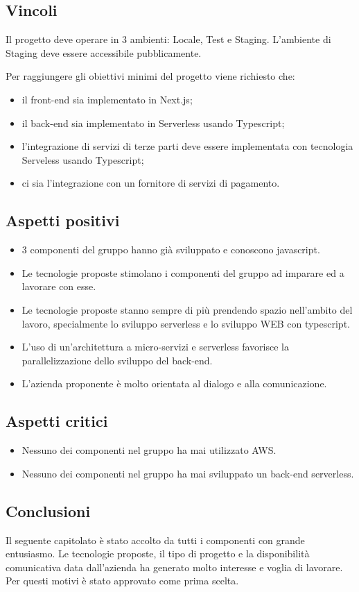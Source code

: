 \subsection{Vincoli}
Il progetto deve operare in 3 ambienti: Locale, Test e Staging.
L'ambiente di Staging deve essere accessibile pubblicamente.

Per raggiungere gli obiettivi minimi del progetto viene richiesto che:
\begin{itemize}
	\item il front-end sia implementato in Next.js;
	\item il back-end sia implementato in Serverless usando Typescript;
	\item l'integrazione di servizi di terze parti deve essere implementata con tecnologia Serveless usando Typescript;
	\item ci sia l'integrazione con un fornitore di servizi di pagamento.
\end{itemize}

\subsection{Aspetti positivi}
\begin{itemize}
	\item 3 componenti del gruppo hanno già sviluppato e conoscono javascript.
	\item Le tecnologie proposte stimolano i componenti del gruppo ad imparare ed a lavorare con esse.
	\item Le tecnologie proposte stanno sempre di più prendendo spazio nell'ambito del lavoro, specialmente lo sviluppo serverless e lo sviluppo WEB con typescript.
	\item L'uso di un'architettura a micro-servizi e serverless favorisce la parallelizzazione dello sviluppo del back-end.
	\item L'azienda proponente è molto orientata al dialogo e alla comunicazione.
\end{itemize}

\subsection{Aspetti critici}
\begin{itemize}
	\item Nessuno dei componenti nel gruppo ha mai utilizzato AWS.
	\item Nessuno dei componenti nel gruppo ha mai sviluppato un back-end serverless.
\end{itemize}

\subsection{Conclusioni}
Il seguente capitolato è stato accolto da tutti i componenti con grande entusiasmo. Le tecnologie proposte, il tipo di progetto e la disponibilità comunicativa data dall'azienda ha generato molto interesse e voglia di lavorare. Per questi motivi è stato approvato come prima scelta.